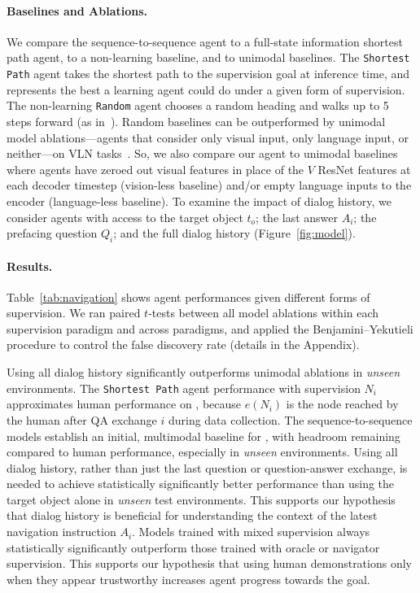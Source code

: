 \paragraph{Baselines and Ablations.}
We compare the sequence-to-sequence agent to a full-state information shortest path agent, to a non-learning baseline, and to unimodal baselines.
The \texttt{Shortest Path} agent takes the shortest path to the supervision goal at inference time, and represents the best a learning agent could do under a given form of supervision.
The non-learning \texttt{Random} agent chooses a random heading and walks up to 5 steps forward (as in~\cite{anderson:cvpr18}).
Random baselines can be outperformed by unimodal model ablations---agents that consider only visual input, only language input, or neither---on VLN tasks~\cite{thomason:naacl19}.
So, we also compare our agent to unimodal baselines where agents have zeroed out visual features in place of the $V$ ResNet features at each decoder timestep (vision-less baseline) and/or empty language inputs to the encoder (language-less baseline).
To examine the impact of dialog history, we consider agents with access to the target object $t_o$; the last \ora{} answer $A_i$; the prefacing \nav{} question $Q_i$; and the full dialog history (Figure~\ref{fig:model}).

\paragraph{Results.}
Table~\ref{tab:navigation} shows agent performances given different forms of supervision.
We ran paired $t$-tests between all model ablations within each supervision paradigm and across paradigms, and applied the Benjamini--Yekutieli procedure to control the false discovery rate (details in the Appendix).

Using all dialog history significantly outperforms unimodal ablations in \textit{unseen} environments.
The \texttt{Shortest Path} agent performance with \nav{} supervision $N_i$ approximates human performance on \task{}, because $e(N_i)$ is the node reached by the human \nav{} after QA exchange $i$ during data collection.
The sequence-to-sequence models establish an initial, multimodal baseline for \task{}, with headroom remaining compared to human performance, especially in \textit{unseen} environments.
Using all dialog history, rather than just the last question or question-answer exchange, is needed to achieve statistically significantly better performance than using the target object alone in \textit{unseen} test environments.
This supports our hypothesis that dialog history is beneficial for understanding the context of the latest navigation instruction $A_i$.
Models trained with mixed supervision always statistically significantly outperform those trained with oracle or navigator supervision.
This supports our hypothesis that using human demonstrations only when they appear trustworthy increases agent progress towards the goal.
